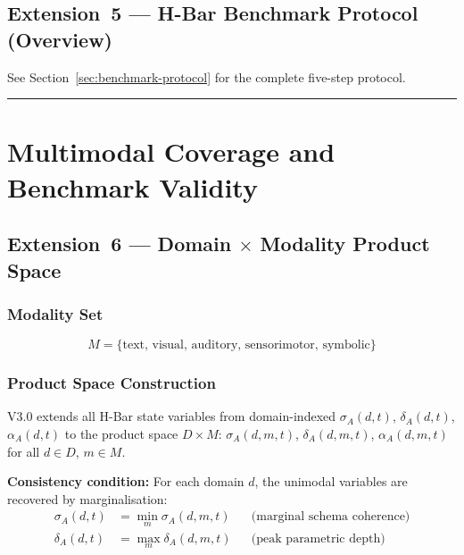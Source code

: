 \documentclass[11pt,a4paper]{article}
\begin{document}
\subsection{Extension~5 --- H-Bar Benchmark Protocol (Overview)}\label{sec:benchmark-overview}

See Section~\ref{sec:benchmark-protocol} for the complete five-step
protocol.

\noindent\rule{\linewidth}{0.4pt}

\section{Multimodal Coverage and Benchmark Validity}\label{sec:multimodal}

\subsection{Extension~6 --- Domain \texorpdfstring{$\times$}{x} Modality Product Space}\label{sec:product-space}

\subsubsection{Modality Set}
\begin{equation}\label{eq:modalities}
M = \{\text{text, visual, auditory, sensorimotor, symbolic}\}
\end{equation}

\subsubsection{Product Space Construction}

V3.0 extends all H-Bar state variables from domain-indexed
$\sigma_A(d, t)$, $\delta_A(d, t)$, $\alpha_A(d, t)$ to the product space $D \times M$:
$\sigma_A(d, m, t)$, $\delta_A(d, m, t)$, $\alpha_A(d, m, t)$ for all $d \in D$, $m \in M$.

\textbf{Consistency condition:} For each domain $d$, the unimodal variables
are recovered by marginalisation:
\begin{align}
\sigma_A(d, t) &= \min_m \sigma_A(d, m, t) & &\text{(marginal schema coherence)} \label{eq:marginal-sigma} \\
\delta_A(d, t) &= \max_m \delta_A(d, m, t) & &\text{(peak parametric depth)} \label{eq:marginal-delta}
\end{align}
\end{document}

